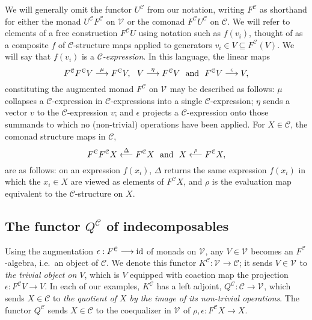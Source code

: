 \documentclass[11pt]{amsart}
\theoremstyle{plain}
\theoremstyle{definition}
\renewcommand{\to}{\longrightarrow}
\newcommand{\from}{\longleftarrow}
\newcommand{\calV}{\mathcal{V}}
\newcommand{\calc}{\mathcal{C}}
\theoremstyle{plain}
\newcommand{\vect}[2]{\calV^{#1}_{#2}}
\newcommand{\Id}{\textup{id}}
\begin{document}
\begin{Conventions and notation}
We will generally omit the functor $U^{\calc}$ from our notation, writing $F^{\calc}$ as shorthand for either the monad $U^{\calc}F^{\calc}$ on $\vect{}{}$ or the comonad $F^{\calc}U^{\calc}$ on $\calc$. We will refer to elements of a free construction $F^\calc U$ using notation such as $f(v_i)$, thought of as a composite $f$ of $\calc$-structure maps applied to generators $v_i\in V\subseteq F^\calc(V)$. We will say that $f(v_i)$ is a \emph{$\calc$-expression}. In this language, the linear maps %
\[F^\calc F^\calc V\overset{\mu}{\to} F^\calc V,\ \ V\overset{\eta}{\to}F^\calc V\ \ \textup{and}\ \ F^\calc V\overset{\epsilon}{\to}V, \]
constituting the augmented monad $F^\calc $ on $\vect{}{}$ may be described as follows: $\mu$ collapses a $\calc$-expression  in $\calc$-expressions into a single $\calc$-expression; $\eta$ sends a vector $v$ to the $\calc$-expression $v$; and $\epsilon$ projects a $\calc$-expression onto those summands to which no (non-trivial) operations have been applied.
For $X\in \calc$, the comonad structure maps in $\calc$,
\[F^\calc F^\calc X\overset{\Delta}{\from} F^\calc X\ \ \textup{and}\ \ X\overset{\rho}{\from}F^\calc X,\]
are as follows: on an expression $f(x_i)$, $\Delta$ returns the same expression $f(x_i)$ in which the $x_i\in X$ are viewed as elements of $F^\calc X$, and $\rho$ is the evaluation map equivalent to the $\calc$-structure on $X$.

\subsection{The functor $Q^\calc$ of indecomposables}
Using the augmentation $\epsilon:F^\calc\to\Id$ of monads on $\vect{}{}$, any $V\in\vect{}{}$ becomes an $F^\calc $-algebra, i.e.\ an object of $\calc$. We denote this functor $K^\calc:\vect{}{}\to \calc$; it sends $V\in\vect{}{}$ to \emph{the trivial object on $V$}, which is $V$ equipped with coaction map the projection $\epsilon:F^{\calc}V\to V$. In each of our examples,  $K^{\calc}$ has a left adjoint, $Q^{\calc}:\calc\to\vect{}{}$, which sends $X\in\calc$ to \emph{the quotient of $X$ by the image of its non-trivial operations}. %
The functor $Q^{\calc}$ sends $X\in \calc$ to the coequalizer in $\vect{}{}$ of $\rho,\epsilon:F^\calc X\to X$.


\end{Conventions and notation}
\end{document}
